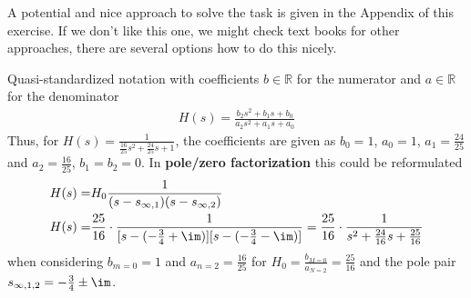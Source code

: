 \begin{Werkzeug}
A potential and nice approach to solve the task is given in the Appendix of this exercise.
If we don't like this one, we might check text books for other approaches, there are several options how to do this nicely.
\end{Werkzeug}
\begin{Ansatz}
Quasi-standardized notation with coefficients $b\in\mathbb{R}$ for the numerator and
$a\in\mathbb{R}$ for the denominator
\begin{align}
H(s) = \frac{b_2 s^2+b_1 s + b_0}{a_2 s^2+a_1 s +a_0}
\end{align}
Thus, for
$H(s) = \frac{1}{\frac{16}{25} s^2 + \frac{24}{25} s + 1}$,
the coefficients are given as
$b_0 = 1$, $a_0=1$, $a_1 = \frac{24}{25}$ and
$a_2 = \frac{16}{25}$, $b_1=b_2=0$.
%
In \textbf{pole/zero factorization} this could be reformulated
\begin{align}
H(s) =& H_0 \frac{1}{(s-s_{\infty,1}) (s-s_{\infty,2})}\\
H(s) =& \frac{25}{16}\cdot\frac{1}{[s-(-\frac{3}{4}+\im)] [s-(-\frac{3}{4}-\im)]}
=
\frac{25}{16}\cdot\frac{1}{s^2 + \frac{24}{16} s  + \frac{25}{16}}
\end{align}
when considering $b_{m=0} = 1$ and $a_{n=2}=\frac{16}{25}$ for
$H_0 = \frac{b_{M=0}}{a_{N=2}}=\frac{25}{16}$ and the pole pair
$s_{\infty,1,2} = -\frac{3}{4} \pm \im$.
\end{Ansatz}

